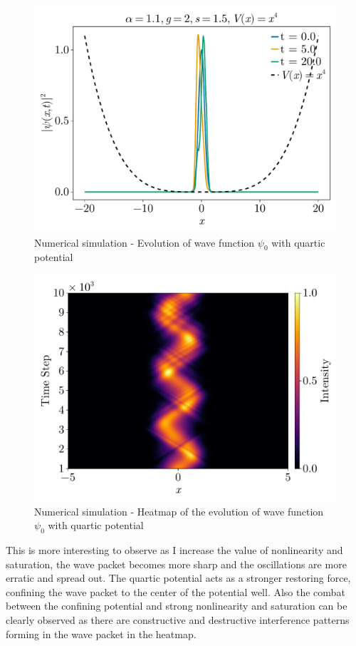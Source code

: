 \documentclass[8pt, a4paper, twocolumn]{article}
\begin{document}
\begin{figure}[h!]
	\centering
	\includegraphics[width=\linewidth]{../figs/fnlse_evolution_quar.pdf}
	\caption{Numerical simulation - Evolution of wave function $\psi_0$ with quartic potential}
	\label{fig:nnfse_evolution_quar}
\end{figure}
\begin{figure}
	\centering
	\includegraphics[width=\linewidth]{../figs/fnlse_heatmap_quar.pdf}
	\caption{Numerical simulation - Heatmap of the evolution of wave function $\psi_0$ with quartic potential}
	\label{fig:nnfse_heatmap_quar}
\end{figure}


This is more interesting to observe as I increase the value of nonlinearity and saturation, the wave packet
becomes more sharp and the oscillations are more erratic and spread out. The quartic potential acts as a
stronger restoring force, confining the wave packet to the center of the potential well. Also the combat between
the confining potential and strong nonlinearity and saturation can be clearly observed as there are constructive and 
destructive interference patterns forming in the wave packet in the heatmap.
\end{document}
